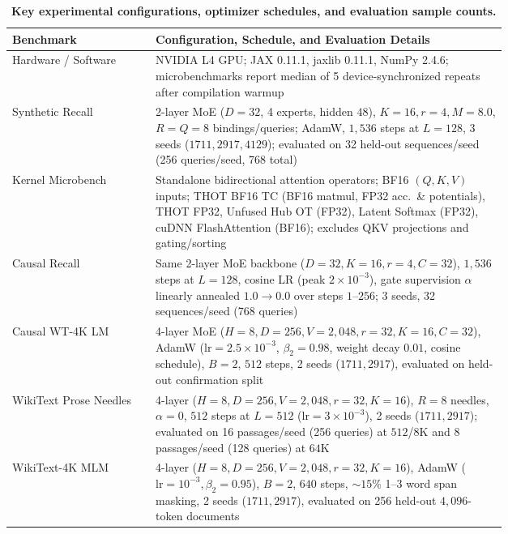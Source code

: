 \documentclass[11pt]{article}
\begin{document}
\begin{table}[htbp]
  \centering
  \small
  \caption{\textbf{Key experimental configurations, optimizer schedules, and evaluation sample counts.}}
  \label{tab:hparams}
  \begin{tabular}{@{}l p{0.71\linewidth}@{}}
    \toprule
    Benchmark & Configuration, Schedule, and Evaluation Details \\
    \midrule
    Hardware / Software & NVIDIA L4 GPU; JAX 0.11.1, jaxlib 0.11.1, NumPy 2.4.6; microbenchmarks report median of 5 device-synchronized repeats after compilation warmup \\
    Synthetic Recall & 2-layer MoE ($D=32$, 4 experts, hidden $48$), $K=16, r=4, M=8.0$, $R=Q=8$ bindings/queries; AdamW, $1{,}536$ steps at $L=128$, 3 seeds ($1711, 2917, 4129$); evaluated on 32 held-out sequences/seed (256 queries/seed, 768 total) \\
    Kernel Microbench & Standalone bidirectional attention operators; BF16 $(Q,K,V)$ inputs; THOT BF16 TC (BF16 matmul, FP32 acc.\ \& potentials), THOT FP32, Unfused Hub OT (FP32), Latent Softmax (FP32), cuDNN FlashAttention (BF16); excludes QKV projections and gating/sorting \\
    Causal Recall & Same 2-layer MoE backbone ($D=32, K=16, r=4, C=32$), $1{,}536$ steps at $L=128$, cosine LR (peak $2\times 10^{-3}$), gate supervision $\alpha$ linearly annealed $1.0 \to 0.0$ over steps $1$--$256$; 3 seeds, 32 sequences/seed (768 queries) \\
    Causal WT-4K LM & 4-layer MoE ($H=8, D=256, V=2{,}048, r=32, K=16, C=32$), AdamW ($\text{lr}=2.5\times 10^{-3}$, $\beta_2=0.98$, weight decay $0.01$, cosine schedule), $B=2$, $512$ steps, 2 seeds ($1711, 2917$), evaluated on held-out confirmation split \\
    WikiText Prose Needles & 4-layer ($H=8, D=256, V=2{,}048, r=32, K=16$), $R=8$ needles, $\alpha=0$, $512$ steps at $L=512$ ($\text{lr}=3\times 10^{-3}$), 2 seeds ($1711, 2917$); evaluated on 16 passages/seed (256 queries) at $512$/$8\text{K}$ and 8 passages/seed (128 queries) at $64\text{K}$ \\
    WikiText-4K MLM & 4-layer ($H=8, D=256, V=2{,}048, r=32, K=16$), AdamW ($\text{lr}=10^{-3}, \beta_2=0.95$), $B=2$, $640$ steps, $\sim 15\%$ 1--3 word span masking, 2 seeds ($1711, 2917$), evaluated on 256 held-out $4{,}096$-token documents \\
    \bottomrule
  \end{tabular}
\end{table}
\end{document}
